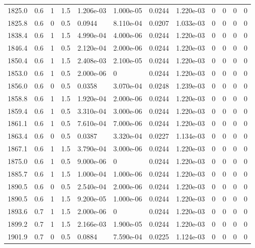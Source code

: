 \documentclass[preview]{standalone}
\begin{document}
{{{{{{{{{{{\begin{tabular}{L{1.2cm}C{1.2cm} C{0.3cm}C{0.5cm} C{1.4cm}C{1.4cm} C{1.4cm}C{1.4cm} C{1.6cm}C{1.6cm} C{1.6cm}C{1.6cm}}
  1825.0  &   0.6  & 1     & 1.5 &  1.206e-03  & 1.000e-05  &  0.0244&   1.220e-03& 0 & 0   &  0 & 0  \\ 
  1825.8  &   0.6  & 0     & 0.5 &  0.0944  & 8.110e-04  &  0.0207&   1.033e-03& 0 & 0   &  0 & 0  \\ 
  1838.4  &   0.6  & 1     & 1.5 &  4.990e-04  & 4.000e-06  &  0.0244&   1.220e-03& 0 & 0   &  0 & 0  \\ 
  1846.4  &   0.6  & 1     & 0.5 &  2.120e-04  & 2.000e-06  &  0.0244&   1.220e-03& 0 & 0   &  0 & 0  \\ 
  1850.4  &   0.6  & 1     & 1.5 &  2.408e-03  & 2.100e-05  &  0.0244&   1.220e-03& 0 & 0   &  0 & 0  \\ 
  1853.0  &   0.6  & 1     & 0.5 &  2.000e-06  & 0  &  0.0244&   1.220e-03& 0 & 0   &  0 & 0  \\ 
  1856.0  &   0.6  & 0     & 0.5 &  0.0358  & 3.070e-04  &  0.0248&   1.239e-03& 0 & 0   &  0 & 0  \\ 
  1858.8  &   0.6  & 1     & 1.5 &  1.920e-04  & 2.000e-06  &  0.0244&   1.220e-03& 0 & 0   &  0 & 0  \\ 
  1859.4  &   0.6  & 1     & 0.5 &  3.310e-04  & 3.000e-06  &  0.0244&   1.220e-03& 0 & 0   &  0 & 0  \\ 
  1861.1  &   0.6  & 1     & 0.5 &  7.610e-04  & 7.000e-06  &  0.0244&   1.220e-03& 0 & 0   &  0 & 0  \\ 
  1863.4  &   0.6  & 0     & 0.5 &  0.0387  & 3.320e-04  &  0.0227&   1.134e-03& 0 & 0   &  0 & 0  \\ 
  1867.1  &   0.6  & 1     & 1.5 &  3.790e-04  & 3.000e-06  &  0.0244&   1.220e-03& 0 & 0   &  0 & 0  \\ 
  1875.0  &   0.6  & 1     & 0.5 &  9.000e-06  & 0  &  0.0244&   1.220e-03& 0 & 0   &  0 & 0  \\ 
  1885.7  &   0.6  & 1     & 1.5 &  1.000e-04  & 1.000e-06  &  0.0244&   1.220e-03& 0 & 0   &  0 & 0  \\ 
  1890.5  &   0.6  & 0     & 0.5 &  2.540e-04  & 2.000e-06  &  0.0244&   1.220e-03& 0 & 0   &  0 & 0  \\ 
  1890.5  &   0.6  & 1     & 1.5 &  9.200e-05  & 1.000e-06  &  0.0244&   1.220e-03& 0 & 0   &  0 & 0  \\ 
  1893.6  &   0.7  & 1     & 1.5 &  2.000e-06  & 0  &  0.0244&   1.220e-03& 0 & 0   &  0 & 0  \\ 
  1899.2  &   0.7  & 1     & 1.5 &  2.166e-03  & 1.900e-05  &  0.0244&   1.220e-03& 0 & 0   &  0 & 0  \\ 
  1901.9  &   0.7  & 0     & 0.5 &  0.0884  & 7.590e-04  &  0.0225&   1.124e-03& 0 & 0   &  0 & 0  \\ 

\end{tabular}}}}}}}}}}}}
\end{document}

